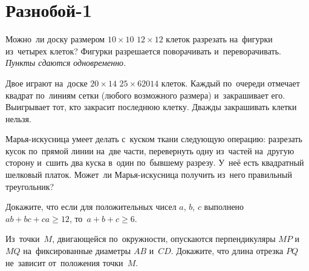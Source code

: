 
\section*{Разнобой-1}



\begin{problems}

\item
Можно~ли доску размером
\quad
\sp $10 \times 10$
\quad
\sp $12 \times 12$
\quad
клеток разрезать на~фигурки
из~четырех клеток?
Фигурки разрешается поворачивать и~переворачивать.
\emph{Пункты сдаются одновременно.}

\item
Двое играют на~доске
\quad
\sp $20 \times 14$
\quad
\sp $25 \times 62014$
\quad
клеток.
Каждый по~очереди отмечает квадрат по~линиям сетки (любого возможного размера)
и~закрашивает его.
Выигрывает тот, кто закрасит последнюю клетку.
Дважды закрашивать клетки нельзя.

\item
Марья-искусница умеет делать с~куском ткани следующую операцию: разрезать кусок
по~прямой линии на~две части, перевернуть одну из~частей на~другую сторону
и~сшить два куска в~один по~бывшему разрезу.
У~неё есть квадратный шелковый платок.
Может~ли Марья-искусница получить из~него правильный треугольник?

\item
Докажите, что если для положительных чисел $a$, $b$, $c$ выполнено
$a b + b c + c a \geq 12$, то~$a + b + c \geq 6$.

\item
Из~точки~$M$, двигающейся по~окружности, опускаются перпендикуляры $MP$ и~$MQ$
на~фиксированные диаметры $AB$ и~$CD$.
Докажите, что длина отрезка $PQ$ не~зависит от~положения точки~$M$.

\end{problems}


